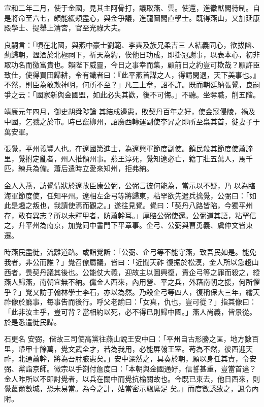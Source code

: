 \begin{pinyinscope}
 宣和二年二月，使于金國，見其主阿骨打，議取燕、雲。使還，進徽猷閣待制。自是將命至六七，頗能緩頰盡心，與金爭議，進龍圖閣直學士。既得燕山，又加延康殿學士、提舉上清宮，官至光祿大夫。



 良嗣言：「頃在北國，與燕中豪士劉範、李奭及族兄柔吉三
 人結義同心，欲拔幽、薊歸朝，瀝酒於北極祠下，祈天為約，俟他日功成，即掛冠謝事，以表本心，初非取功名而徼富貴也。賴陛下威靈，今日之事幸而集，顧前日之約豈可欺哉？願許臣致仕，使得買田歸耕，令有識者曰：『此平燕首謀之人，得請閑退，天下美事也。』不然，則臣為敢欺神明，何所不至？」凡三上章，詔不許。既而朝廷納張覺，良嗣爭之云：「國家新與金國盟，如此必失其歡，後不可悔。」不聽。坐奪職，削五階。



 靖康元年四月，御史胡舜陟論
 其結成邊患，敗契丹百年之好，使金寇侵陵，禍及中國，乞戮之於市。時已竄柳州，詔廣西轉運副使李昇之即所至梟其首，徙妻子于萬安軍。



 張覺，平州義豐人也。在遼國第進士，為遼興軍節度副使。鎮民殺其節度使蕭諦里，覺拊定亂者，州人推領州事。燕王淳死，覺知遼必亡，籍丁壯五萬人，馬千匹，練兵為備。蕭后遣時立愛來知州，拒弗納。



 金人入燕，訪覺情狀於遼故臣康公弼，公弼言彼何能為，當示以不疑，乃
 以為臨海軍節度使，任知平州。遼相左企弓等將歸東，粘罕欲先遣兵擒覺，公弼曰：「如此是趣之叛也，我請使焉而觀之。」遂往見覺。覺曰：「契丹八路皆陷，今獨平州存，敢有異志？所以未釋甲者，防蕭幹耳。」厚賂公弼使還。公弼道其語，粘罕信之，升平州為南京，加覺同中書門下平章事。企弓、公弼與曹勇義、虞仲文皆東遷。



 時燕民盡徙，流離道路。或詣覺訴：「公弼、企弓等不能守燕，致吾民如是。能免我者，非公而誰？」覺召僚屬議，皆曰：「近聞天祚
 復振於松漠，金人所以急趨山西者，畏契丹議其後也。公能仗大義，迎故主以圖興復，責企弓等之罪而殺之，縱燕人歸燕，南朝宜無不納。儻金人西來，內用營、平之兵，外藉南朝之援，何所懼乎？」覺又訪于翰林學士李石，亦以為然。乃殺企弓等四人，復稱保大三年，繪天祚像於廳事，每事告而後行。呼父老諭曰：「女真，仇也，豈可從？」指其像曰：「此非汝主乎，豈可背？當相約以死，必不得已則歸中國。」燕人尚義，皆景從。於是悉遣徙民歸。



 石更名
 安弼，偕故三司使高黨往燕山說王安中曰：「平州自古形勝之區，地方數百里，帶甲十餘萬，覺文武全才，若為我用，必能屏翰王室。苟為不然，彼西迎天祚，北通蕭幹，將為吾肘腋患矣。」安中深然之，具奏於朝，願以身任其責，令安弼、黨詣京師。徽宗以手劄付詹度曰：「本朝與金國通好，信誓甚重，豈當首違？金人昨所以不即討覺者，以兵在關中而覺抗榆關故也。今既已東去，他日西來，則覺蕞爾數城，恐未易當。為今之計，姑當密示羈縻足
 矣。」而度數誘致之，諷令內附。




\end{pinyinscope}
